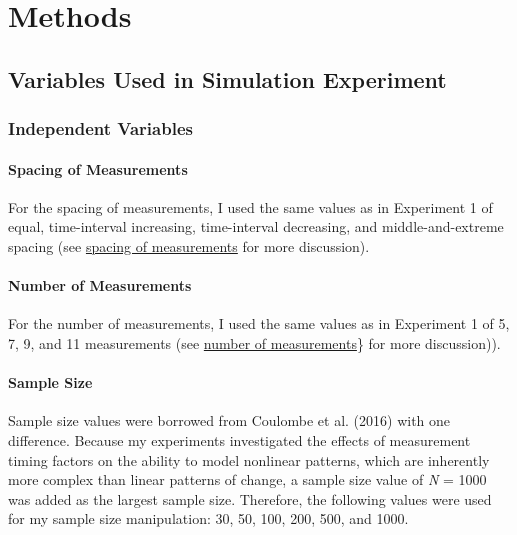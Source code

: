 \documentclass[
12pt, %
twoside,
english]{guelphthesis}
\theoremstyle{definition}
\theoremstyle{definition}
\theoremstyle{definition}
\theoremstyle{definition}
\theoremstyle{remark}
\begin{document}
\hypertarget{methods-1}{%
\section{Methods}\label{methods-1}}

\hypertarget{variables-used-in-simulation-experiment-1}{%
\subsection{Variables Used in Simulation Experiment}\label{variables-used-in-simulation-experiment-1}}

\hypertarget{independent-variables-1}{%
\subsubsection{Independent Variables}\label{independent-variables-1}}

\hypertarget{spacing-of-measurements-1}{%
\paragraph{Spacing of Measurements}\label{spacing-of-measurements-1}}

For the spacing of measurements, I used the same values as in Experiment 1 of equal, time-interval increasing, time-interval decreasing, and middle-and-extreme spacing (see \protect\hyperlink{spacing-measurements}{spacing of measurements} for more discussion).

\hypertarget{number-of-measurements-1}{%
\paragraph{Number of Measurements}\label{number-of-measurements-1}}

For the number of measurements, I used the same values as in Experiment 1 of 5, 7, 9, and 11 measurements (see \protect\hyperlink{number-measurements}{number of measurements}\} for more discussion)).

\hypertarget{sample-size}{%
\paragraph{Sample Size}\label{sample-size}}

Sample size values were borrowed from Coulombe et al. (2016) with one difference.
Because my experiments investigated the effects of measurement timing
factors on the ability to model nonlinear patterns, which are inherently
more complex than linear patterns of change, a sample size value of \emph{N}
= 1000 was added as the largest sample size. Therefore, the following
values were used for my sample size manipulation: 30, 50, 100, 200, 500,
and 1000.
\end{document}
